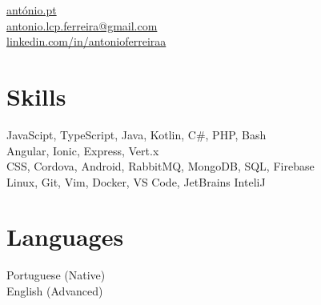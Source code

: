 \documentclass[]{hieudo-build}
\begin{document}
%
%
{
	\faHome \space \href{http://www.antónio.pt}{antónio.pt 
	}\\
	\faEnvelope \space \href{mailto:antonio.lcp.ferreira@gmail.com}{antonio.lcp.ferreira@gmail.com}\\
	\faLinkedinSquare \space \href{https://www.linkedin.com/in/antonioferreiraa}{linkedin.com/in/antonioferreiraa}
}
    
%
%
\begin{minipage}[t]{0.25\textwidth} 



\section{Skills}
JavaScipt, TypeScript, Java, Kotlin, C\#, PHP, Bash\\ 
\sectionsep
{}
Angular, Ionic, Express, Vert.x \\
\sectionsep
{}
CSS, Cordova, Android, RabbitMQ, MongoDB, SQL, Firebase \\
\sectionsep
{}
Linux, Git, Vim, Docker, VS Code, JetBrains InteliJ \\

\sectionsep

\section{Languages}
Portuguese (Native) \\
English (Advanced)
\sectionsep


\sectionsep

%
%
\end{minipage} 
\end{document}
